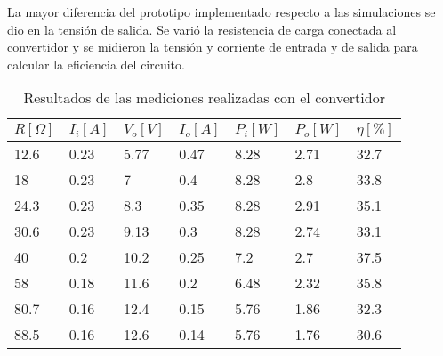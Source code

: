 La mayor diferencia del prototipo implementado respecto a las simulaciones se dio en la tensión de salida. 
Se varió la resistencia de carga conectada al convertidor y se midieron la tensión y corriente de entrada y de salida para calcular la eficiencia del circuito.

\begin{table}[H]
    \centering
    \begin{tabular}{lllllll}
        \hline
        \multicolumn{1}{c}{$R[\Omega]$} & \multicolumn{1}{c}{$I_i[A]$} & \multicolumn{1}{c}{$V_o[V]$} & \multicolumn{1}{c}{$I_o[A]$} & \multicolumn{1}{c}{$P_i[W]$} & \multicolumn{1}{c}{$P_o[W]$} & \multicolumn{1}{c}{$\eta[\%]$} \\ \hline
        12.6                            & 0.23                         & 5.77                         & 0.47                         & 8.28                         & 2.71                         & 32.7                           \\
        18                              & 0.23                         & 7                            & 0.4                          & 8.28                         & 2.8                          & 33.8                           \\
        24.3                            & 0.23                         & 8.3                          & 0.35                         & 8.28                         & 2.91                         & 35.1                           \\
        30.6                            & 0.23                         & 9.13                         & 0.3                          & 8.28                         & 2.74                         & 33.1                           \\
        40                              & 0.2                          & 10.2                         & 0.25                         & 7.2                          & 2.7                          & 37.5                           \\
        58                              & 0.18                         & 11.6                         & 0.2                          & 6.48                         & 2.32                         & 35.8                           \\
        80.7                            & 0.16                         & 12.4                         & 0.15                         & 5.76                         & 1.86                         & 32.3                           \\
        88.5                            & 0.16                         & 12.6                         & 0.14                         & 5.76                         & 1.76                         & 30.6                           \\ \hline
    \end{tabular}
    \caption{Resultados de las mediciones realizadas con el convertidor}
    \label{tab:mediciones}
\end{table}

